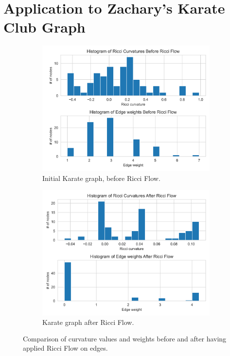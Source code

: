 \section{Application to Zachary's Karate Club Graph}
\label{sec5.3}

\begin{figure}[h]
    \centering
    \begin{subfigure}{0.45\textwidth}
        \centering
        \includegraphics[width=\textwidth]{../KarateClubResults/Before Ricci Flow.png}
        \caption{Initial Karate graph, before Ricci Flow.}
        \label{fig:Karate_Before_Ricci_flow_histo}
    \end{subfigure}
    \hfill
    \begin{subfigure}{0.45\textwidth}
        \centering
        \includegraphics[width=\textwidth]{../KarateClubResults/After Ricci Flow.png}
        \caption{Karate graph after Ricci Flow.}
        \label{fig:Karate_After_Ricci_flow_histo}
    \end{subfigure}
    \caption{Comparison of curvature values and weights before and after having applied Ricci Flow on edges.}
    \label{fig:Karate_comparison_histo}
\end{figure}

